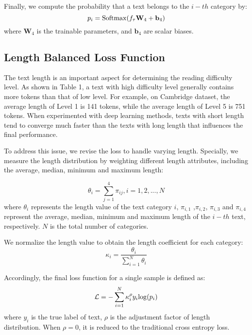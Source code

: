\documentclass[11pt]{article}
\begin{document}
Finally, we compute the probability that a text belongs to the $i-th$ category by:
\begin{equation}
p_i = {\rm Softmax}(f_{\tau}\mathbf W_4 + \mathbf b_4)
\end{equation}
where $\mathbf W_4$ is the trainable parameters, and $\mathbf b_4$ are scalar biases.


\subsection{Length Balanced Loss Function}
The text length is an important aspect for determining the reading difficulty level. As shown in Table 1, a text with high difficulty level generally contains more tokens than that of low level. For example, on Cambridge dataset, the average length of Level 1 is 141 tokens, while the average length of Level 5 is 751 tokens.
When experimented with deep learning methods, texts with short length tend to converge much faster than the texts with long length that influences the final performance. 


To address this issue, we revise the loss to handle varying length.
Specially, we measure the length distribution by weighting different length attributes, including the average, median, minimum and maximum length: 

\begin{equation}
\theta_i = \sum\limits_{j=1}^4 \pi_{ij},i=1,2,...,N
\end{equation}
where $\theta_i$ represents the length value of the text category $i$, $\pi_{i,1}$ ,$\pi_{i,2}$, $\pi_{i,3}$ and $\pi_{i,4}$ represent the average, median, minimum and maximum length of the $i-th$ text, respectively. $N$ is the total number of categories.


We normalize the length value to obtain the length coefficient for each category:
\begin{equation}
\kappa_i = \frac{\theta_i}{\sum\limits_{i=1}^N \theta_i}
\end{equation}


Accordingly, the final loss function for a single sample is defined as:
\begin{equation}
\mathcal L = -\sum\limits_{i=1}^{N} \kappa_i^{\rho} y_i {\rm log}(p_i)
\end{equation}
where $y_i$ is the true label of text, $\rho$ is the adjustment factor of length distribution. When $\rho=0$, it is reduced to the traditional cross entropy loss.
\end{document}
